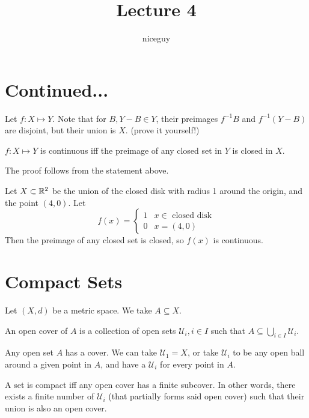 \documentclass[12pt]{article}
\title{Lecture 4}
\author{niceguy}
\begin{document}
\maketitle

\section{Continued...}

Let $f: X \mapsto Y$. Note that for $B, Y-B \in Y$, their preimages $f^{-1}B$ and $f^{-1}(Y-B)$ are disjoint, but their union is $X$. (prove it yourself!)

\begin{prop}
    $f: X \mapsto Y$ is continuous iff the preimage of any closed set in $Y$ is closed in $X$.
\end{prop}

The proof follows from the statement above.

\begin{ex}
    Let $X \subset \mathbb{R}^2$ be the union of the closed disk with radius 1 around the origin, and the point $(4,0)$. Let
    $$f(x) = \begin{cases} 1 & x \in \text{ closed disk} \\ 0 & x = (4,0) \end{cases}$$
    Then the preimage of any closed set is closed, so $f(x)$ is continuous.
\end{ex}

\section{Compact Sets}

Let $(X,d)$ be a metric space. We take $A \subseteq X$.

\begin{defn}
    An open cover of $A$ is a collection of open sets $\mathcal U_i, i \in I$ such that $A \subseteq \bigcup_{i \in I} \mathcal U_i$.
\end{defn}

\begin{rem}
    Any open set $A$ has a cover. We can take $\mathcal U_1 = X$, or take $\mathcal U_i$ to be any open ball around a given point in $A$, and have a $\mathcal U_i$ for every point in $A$.
\end{rem}

\begin{defn}[Compact]
    A set is compact iff any open cover has a finite subcover. In other words, there exists a finite number of $\mathcal U_i$ (that partially forms said open cover) such that their union is also an open cover.
\end{defn}
\end{document}

